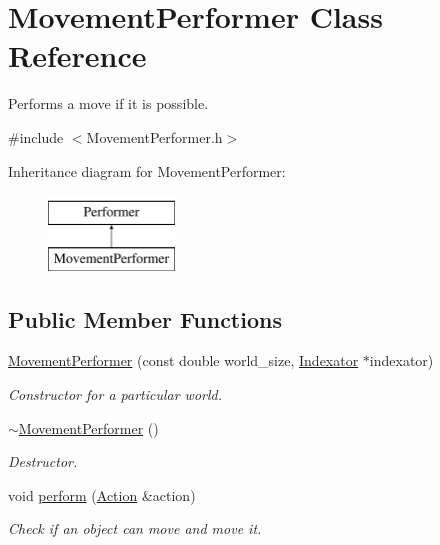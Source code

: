 \hypertarget{classMovementPerformer}{\section{Movement\-Performer Class Reference}
\label{classMovementPerformer}
}


Performs a move if it is possible.  




{\ttfamily \#include $<$Movement\-Performer.\-h$>$}

Inheritance diagram for Movement\-Performer\-:\begin{figure}[H]
\begin{center}
\leavevmode
\includegraphics[height=2.000000cm]{classMovementPerformer}
\end{center}
\end{figure}
\subsection*{Public Member Functions}
\begin{DoxyCompactItemize}
\item 
\hyperlink{classMovementPerformer_a0d6336185e76b26141cfe7d2cd1d2066}{Movement\-Performer} (const double world\-\_\-size, \hyperlink{classIndexator}{Indexator} $\ast$indexator)
\begin{DoxyCompactList}\small\item\em Constructor for a particular world. \end{DoxyCompactList}\item 
\hyperlink{classMovementPerformer_a1715f190dbee77f4cc4a2c9a58a9064a}{$\sim$\-Movement\-Performer} ()
\begin{DoxyCompactList}\small\item\em Destructor. \end{DoxyCompactList}\item 
void \hyperlink{classMovementPerformer_aba62f523d2a9450a75fff98e350345b3}{perform} (\hyperlink{classAction}{Action} \&action)
\begin{DoxyCompactList}\small\item\em Check if an object can move and move it. \end{DoxyCompactList}\end{DoxyCompactItemize}


